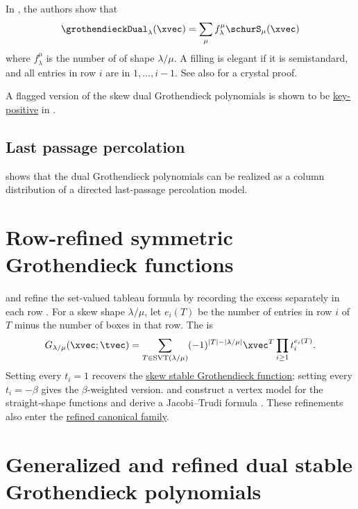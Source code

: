 In \cite[Thm.~9.8]{LamPylyavskyy2007combinatorialhopf}, the authors show that
\[
\grothendieckDual_\lambda(\xvec) = \sum_\mu f^\mu_\lambda \schurS_\mu(\xvec)
\]
where $f^\mu_\lambda$ is the number of
\label{elegantFilling} of shape $\lambda/\mu$.
A filling is elegant if it is semistandard, and all entries in row $i$ are in $1,\dotsc,i-1$.
See also \cite{Galashin2017} for a crystal proof.


A flagged version of the skew dual Grothendieck polynomials is
shown to be \hyperref[key]{key-positive} in \cite{Kundu2023x}.


\subsection[dualGrothendieckPercolation]{Last passage percolation}

 shows \cite{Yeliussizov2020} that the dual Grothendieck polynomials
can be realized as a column distribution of a directed last-passage percolation model.


\section[grothendieckRefinedSymmetric]{Row-refined symmetric Grothendieck functions}

 and  refine the set-valued tableau
formula by recording the excess separately in each row
\cite{ChanPflueger2019}. For a skew shape $\lambda/\mu$, let $e_i(T)$ be
the number of entries in row $i$ of $T$ minus the number of boxes in that row.
The  is
\[
 G_{\lambda/\mu}(\xvec;\tvec)
 =\sum_{T\in\mathrm{SVT}(\lambda/\mu)}
 (-1)^{|T|-|\lambda/\mu|}\xvec^T\prod_{i\geq1}t_i^{e_i(T)}.
\]
Setting every $t_i=1$ recovers the
\hyperref[grothendieckSkewStable]{skew stable Grothendieck function};
setting every $t_i=-\beta$ gives the $\beta$-weighted version.
 and  construct a vertex model
for the straight-shape functions and derive a Jacobi--Trudi formula
\cite{MotegiScrimshaw2025}. These refinements also enter the
\hyperref[grothendieckRefinedCanonical]{refined canonical family}.

\section[grothendieckRefinedDualStable]{Generalized and refined dual stable Grothendieck polynomials}


